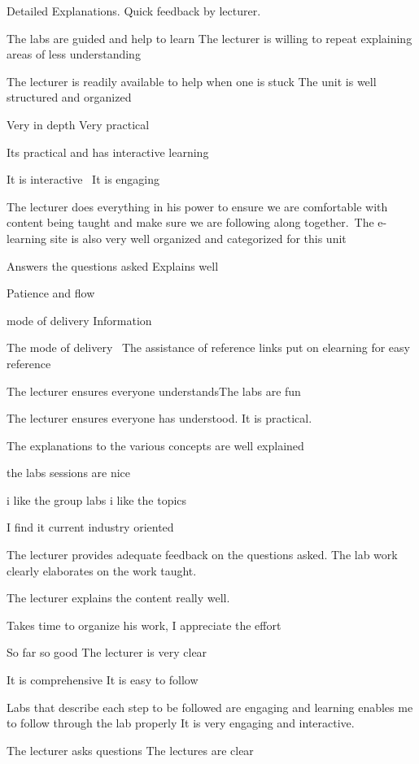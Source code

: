 \documentclass[
]{article}
\begin{document}
\begin{enumerate}
\begin{itemize}
    Detailed Explanations. Quick feedback by lecturer.

    The labs are guided and help to learn The lecturer is willing to
    repeat explaining areas of less understanding

    The lecturer is readily available to help when one is stuck The unit
    is well structured and organized

    Very in depth Very practical

    Its practical and has interactive learning~

    It is interactive~ It is engaging

    The lecturer does everything in his power to ensure we are
    comfortable with content being taught and make sure we are following
    along together.~The e-learning site is also very well organized and
    categorized for this unit

    Answers the questions asked Explains well

    Patience and flow

    mode of delivery Information

    The mode of delivery~ The assistance of reference links put on
    elearning for easy reference~

    The lecturer ensures everyone understandsThe labs are fun

    The lecturer ensures everyone has understood. It is practical.

    The explanations to the various concepts are well explained~

    the labs sessions are nice

    i like the group labs i like the topics

    I find it current industry oriented

    The lecturer provides adequate feedback on the questions asked. The
    lab work clearly elaborates on the work taught.

    The lecturer explains the content really well.

    Takes time to organize his work, I appreciate the effort

    So far so good The lecturer is very clear

    It is comprehensive It is easy to follow

    Labs that describe each step to be followed are engaging and
    learning enables me to follow through the lab properly It is very
    engaging and interactive.

    The lecturer asks questions The lectures are clear~


\end{itemize}
\end{enumerate}
\end{document}

